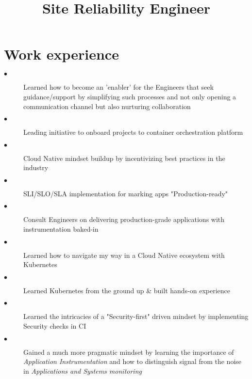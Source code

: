 \documentclass[11pt,a4paper,Hack,english]{moderncv}        %
\title{Site Reliability Engineer}%
\begin{document}
\makecvtitle
\section{Work experience}
{
	\begin{description}
		\item[$\bullet$] Learned how to become an 'enabler' for the Engineers that seek guidance/support by
                     simplifying such processes and not only opening a communication channel but also
                     nurturing collaboration
		\item[$\bullet$] Leading initiative to onboard projects to container orchestration platform
		\item[$\bullet$] Cloud Native mindset buildup by incentivizing best practices in the industry
		\item[$\bullet$] SLI/SLO/SLA implementation for marking apps "Production-ready"
		\item[$\bullet$] Consult Engineers on delivering production-grade applications with instrumentation baked-in
	\end{description}
}

{
	\begin{description}
		\item[$\bullet$] Learned how to navigate my way in a Cloud Native ecosystem with Kubernetes
    \item[$\bullet$] Learned Kubernetes from the ground up \& built hands-on experience
    \item[$\bullet$] Learned the intricacies of a "Security-first" driven mindset by implementing Security checks in CI
    \item[$\bullet$] Gained a much more pragmatic mindset by learning the importance of \textit{Application Instrumentation}
                     and how to distinguish signal from the noise in \textit{Applications and Systems monitoring}
	\end{description}
}
\end{document}
